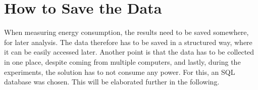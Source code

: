 \section{How to Save the Data}\label{sec:save_data}

When measuring energy consumption, the results need to be saved somewhere, for later analysis. The data therefore has to be saved in a structured way, where it can be easily accessed later. Another point is that the data has to be collected in one place, despite coming from multiple computers, and lastly, during the experiments, the solution has to not consume any power. For this, an SQL database was chosen. This will be elaborated further in the following.

